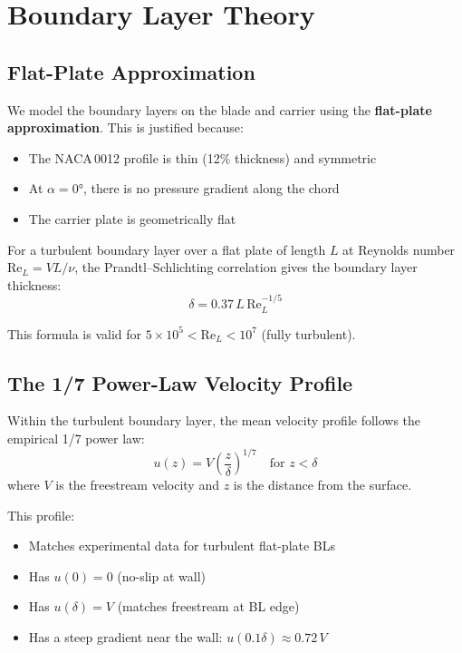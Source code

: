 \documentclass[11pt,a4paper]{article}
\begin{document}
\section{Boundary Layer Theory}
\label{sec:bl-theory}

\subsection{Flat-Plate Approximation}

We model the boundary layers on the blade and carrier using the
\textbf{flat-plate approximation}. This is justified because:
\begin{itemize}[nosep]
  \item The NACA\,0012 profile is thin (12\% thickness) and symmetric
  \item At $\alpha = 0°$, there is no pressure gradient along the chord
  \item The carrier plate is geometrically flat
\end{itemize}

For a turbulent boundary layer over a flat plate of length $L$ at Reynolds
number $\mathrm{Re}_L = V L / \nu$, the Prandtl--Schlichting correlation gives
the boundary layer thickness:
\begin{equation}
  \boxed{\delta = 0.37 \, L \, \mathrm{Re}_L^{-1/5}}
  \label{eq:delta-flat-plate}
\end{equation}

This formula is valid for $5 \times 10^5 < \mathrm{Re}_L < 10^7$ (fully turbulent).

\subsection{The 1/7 Power-Law Velocity Profile}

Within the turbulent boundary layer, the mean velocity profile follows the
empirical 1/7 power law:
\begin{equation}
  \boxed{u(z) = V \left(\frac{z}{\delta}\right)^{1/7} \quad \text{for } z < \delta}
  \label{eq:one-seventh}
\end{equation}
where $V$ is the freestream velocity and $z$ is the distance from the surface.

This profile:
\begin{itemize}[nosep]
  \item Matches experimental data for turbulent flat-plate BLs
  \item Has $u(0) = 0$ (no-slip at wall)
  \item Has $u(\delta) = V$ (matches freestream at BL edge)
  \item Has a steep gradient near the wall: $u(0.1\delta) \approx 0.72\,V$
\end{itemize}
\end{document}
